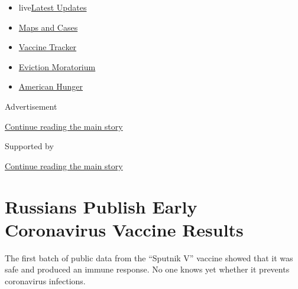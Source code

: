 \begin{itemize}
\tightlist
\item
  live\href{https://www.nytimes3xbfgragh.onion/2020/09/09/world/covid-19-coronavirus.html?name=styln-coronavirus-national\&region=TOP_BANNER\&block=storyline_menu_recirc\&action=click\&pgtype=Article\&impression_id=cd4570f1-f27f-11ea-b780-1bb5a09dbead\&variant=undefined}{Latest
  Updates}
\item
  \href{https://www.nytimes3xbfgragh.onion/interactive/2020/us/coronavirus-us-cases.html?name=styln-coronavirus-national\&region=TOP_BANNER\&block=storyline_menu_recirc\&action=click\&pgtype=Article\&impression_id=cd4570f2-f27f-11ea-b780-1bb5a09dbead\&variant=undefined}{Maps
  and Cases}
\item
  \href{https://www.nytimes3xbfgragh.onion/interactive/2020/science/coronavirus-vaccine-tracker.html?name=styln-coronavirus-national\&region=TOP_BANNER\&block=storyline_menu_recirc\&action=click\&pgtype=Article\&impression_id=cd4570f3-f27f-11ea-b780-1bb5a09dbead\&variant=undefined}{Vaccine
  Tracker}
\item
  \href{https://www.nytimes3xbfgragh.onion/2020/09/02/your-money/eviction-moratorium-covid.html?name=styln-coronavirus-national\&region=TOP_BANNER\&block=storyline_menu_recirc\&action=click\&pgtype=Article\&impression_id=cd4570f4-f27f-11ea-b780-1bb5a09dbead\&variant=undefined}{Eviction
  Moratorium}
\item
  \href{https://www.nytimes3xbfgragh.onion/interactive/2020/09/02/magazine/food-insecurity-hunger-us.html?name=styln-coronavirus-national\&region=TOP_BANNER\&block=storyline_menu_recirc\&action=click\&pgtype=Article\&impression_id=cd4570f5-f27f-11ea-b780-1bb5a09dbead\&variant=undefined}{American
  Hunger}
\end{itemize}

Advertisement

\protect\hyperlink{after-top}{Continue reading the main story}

Supported by

\protect\hyperlink{after-sponsor}{Continue reading the main story}

\hypertarget{russians-publish-early-coronavirus-vaccine-results}{%
\section{Russians Publish Early Coronavirus Vaccine
Results}\label{russians-publish-early-coronavirus-vaccine-results}}

The first batch of public data from the ``Sputnik V'' vaccine showed
that it was safe and produced an immune response. No one knows yet
whether it prevents coronavirus infections.

